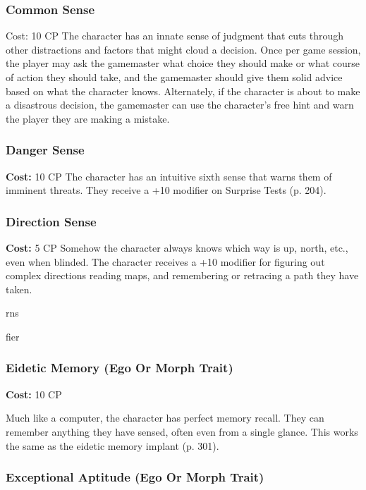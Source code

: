 \subsubsection{Common Sense}

Cost: 10 CP
The character has an innate sense of judgment that 
cuts through other distractions and factors that might 
cloud a decision. Once per game session, the player 
may ask the gamemaster what choice they should 
make or what course of action they should take, and 
the gamemaster should give them solid advice based 
on what the character knows. Alternately, if the 
character is about to make a disastrous decision, the 
gamemaster can use the character's free hint and warn 
the player they are making a mistake.

\subsubsection{Danger Sense}

\textbf{Cost:} 10 CP
The character has an intuitive sixth sense that warns 
them of imminent threats. They receive a +10 modifier 
on Surprise Tests (p. 204).

\subsubsection{Direction Sense}

\textbf{Cost:} 5 CP
Somehow the character always knows which way 
is up, north, etc., even when blinded. The character 
receives a +10 modifier for figuring out complex directions
reading maps, and remembering or retracing
a path they have taken.

rns 

fier 

\subsubsection{Eidetic Memory (Ego Or Morph Trait)}

\textbf{Cost:} 10 CP

Much like a computer, the character has perfect 
memory recall. They can remember anything they have 
sensed, often even from a single glance. This works the 
same as the eidetic memory implant (p. 301).

\subsubsection{Exceptional Aptitude (Ego Or Morph Trait)}

